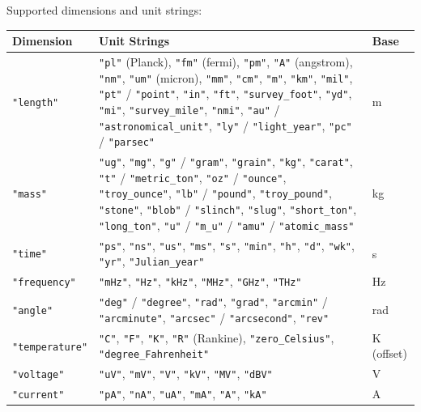 Supported dimensions and unit strings:

\begin{table}[h]
\centering
\footnotesize
\begin{tabular}{|l|p{10cm}|l|}
\hline
\textbf{Dimension} & \textbf{Unit Strings} & \textbf{Base} \\
\hline
\texttt{"length"} & \texttt{"pl"} (Planck), \texttt{"fm"} (fermi), \texttt{"pm"}, \texttt{"A"} (angstrom), \texttt{"nm"}, \texttt{"um"} (micron), \texttt{"mm"}, \texttt{"cm"}, \texttt{"m"}, \texttt{"km"}, \texttt{"mil"}, \texttt{"pt"} / \texttt{"point"}, \texttt{"in"}, \texttt{"ft"}, \texttt{"survey\_foot"}, \texttt{"yd"}, \texttt{"mi"}, \texttt{"survey\_mile"}, \texttt{"nmi"}, \texttt{"au"} / \texttt{"astronomical\_unit"}, \texttt{"ly"} / \texttt{"light\_year"}, \texttt{"pc"} / \texttt{"parsec"} & m \\
\hline
\texttt{"mass"} & \texttt{"ug"}, \texttt{"mg"}, \texttt{"g"} / \texttt{"gram"}, \texttt{"grain"}, \texttt{"kg"}, \texttt{"carat"}, \texttt{"t"} / \texttt{"metric\_ton"}, \texttt{"oz"} / \texttt{"ounce"}, \texttt{"troy\_ounce"}, \texttt{"lb"} / \texttt{"pound"}, \texttt{"troy\_pound"}, \texttt{"stone"}, \texttt{"blob"} / \texttt{"slinch"}, \texttt{"slug"}, \texttt{"short\_ton"}, \texttt{"long\_ton"}, \texttt{"u"} / \texttt{"m\_u"} / \texttt{"amu"} / \texttt{"atomic\_mass"} & kg \\
\hline
\texttt{"time"} & \texttt{"ps"}, \texttt{"ns"}, \texttt{"us"}, \texttt{"ms"}, \texttt{"s"}, \texttt{"min"}, \texttt{"h"}, \texttt{"d"}, \texttt{"wk"}, \texttt{"yr"}, \texttt{"Julian\_year"} & s \\
\hline
\texttt{"frequency"} & \texttt{"mHz"}, \texttt{"Hz"}, \texttt{"kHz"}, \texttt{"MHz"}, \texttt{"GHz"}, \texttt{"THz"} & Hz \\
\hline
\texttt{"angle"} & \texttt{"deg"} / \texttt{"degree"}, \texttt{"rad"}, \texttt{"grad"}, \texttt{"arcmin"} / \texttt{"arcminute"}, \texttt{"arcsec"} / \texttt{"arcsecond"}, \texttt{"rev"} & rad \\
\hline
\texttt{"temperature"} & \texttt{"C"}, \texttt{"F"}, \texttt{"K"}, \texttt{"R"} (Rankine), \texttt{"zero\_Celsius"}, \texttt{"degree\_Fahrenheit"} & K (offset) \\
\hline
\texttt{"voltage"} & \texttt{"uV"}, \texttt{"mV"}, \texttt{"V"}, \texttt{"kV"}, \texttt{"MV"}, \texttt{"dBV"} & V \\
\hline
\texttt{"current"} & \texttt{"pA"}, \texttt{"nA"}, \texttt{"uA"}, \texttt{"mA"}, \texttt{"A"}, \texttt{"kA"} & A \\

\end{tabular}
\end{table}
